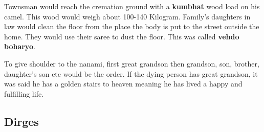 Townsman would reach the cremation ground with a \textbf{kumbhat} wood load on
his camel. This wood would weigh about 100-140 Kilogram. Family's daughters in
law would clean the floor from the place the body is put to the street outside
the home. They would use their saree to dust the floor. This was called
\textbf{vehdo boharyo}.

To give shoulder to the nanami, first great grandson then grandson, son,
brother, daughter's son etc would be the order. If the dying person has great
grandson, it was said he has a golden stairs to heaven meaning he has lived a
happy and fulfilling life. 

\subsection{Dirges}
